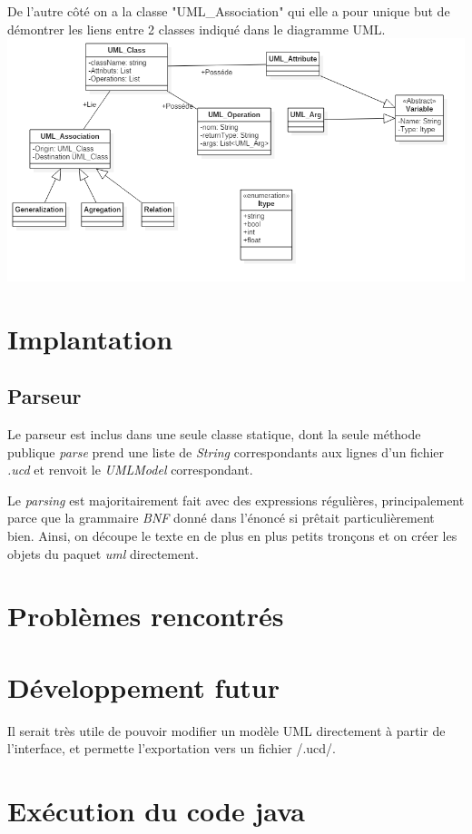 \documentclass[letter,french]{report}
\begin{document}
De l'autre côté on a la
classe "UML\_Association" qui elle a pour unique but de démontrer les liens
entre 2 classes indiqué dans le diagramme UML.
\newline
\includegraphics[scale=.4]{DiagrammeClasse.png}

\section*{Implantation}

\subsection{Parseur}
Le parseur est inclus dans une seule classe statique, dont la seule méthode
publique \emph{parse} prend une liste de \emph{String} correspondants aux lignes d'un
fichier \emph{.ucd} et renvoit le \emph{UMLModel} correspondant. 

Le \emph{parsing} est majoritairement fait avec des expressions régulières,
principalement parce que la grammaire \emph{BNF} donné dans l'énoncé si
prêtait particulièrement bien. Ainsi, on découpe le texte en de plus en plus
petits tronçons et on créer les objets du paquet \emph{uml} directement.

\section*{Problèmes rencontrés}

\section*{Développement futur}
Il serait très utile de pouvoir modifier un modèle UML directement à partir de l'interface,
et permette l'exportation vers un fichier /.ucd/.



\section*{Exécution du code java}
\end{document}
